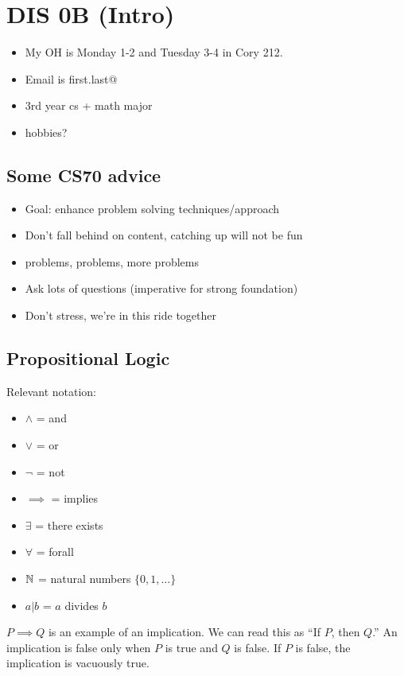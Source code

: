 \section{DIS 0B (Intro)}
\begin{itemize}
    \item My OH is Monday 1-2 and Tuesday 3-4 in Cory 212. 
    \item Email is first.last@
    \item 3rd year cs + math major 
    \item hobbies?
\end{itemize}

\subsection{Some CS70 advice}
\begin{itemize}
    \item Goal: enhance problem solving techniques/approach
    \item Don't fall behind on content, catching up will not be fun
    \item problems, problems, more problems
    \item Ask lots of questions (imperative for strong foundation)
    \item Don't stress, we're in this ride together
\end{itemize}

\subsection{Propositional Logic}
Relevant notation: \begin{itemize}
    \item $\land$ = and 
    \item $\lor$ = or 
    \item $\neg$ = not 
    \item $\implies$ = implies
    \item $\exists$ = there exists
    \item $\forall$ = forall
    \item $\operatorname{\mathbb{N}}$ = natural numbers $\{0, 1, \ldots \}$ 
    \item $a|b$ = $a$ divides $b$
\end{itemize}

$P \implies Q$ is an example of an implication. We can read this as ``If $P$, then $Q$.'' An implication is false only when $P$ is true and $Q$ is false. If $P$ is false, the implication is vacuously true. 

